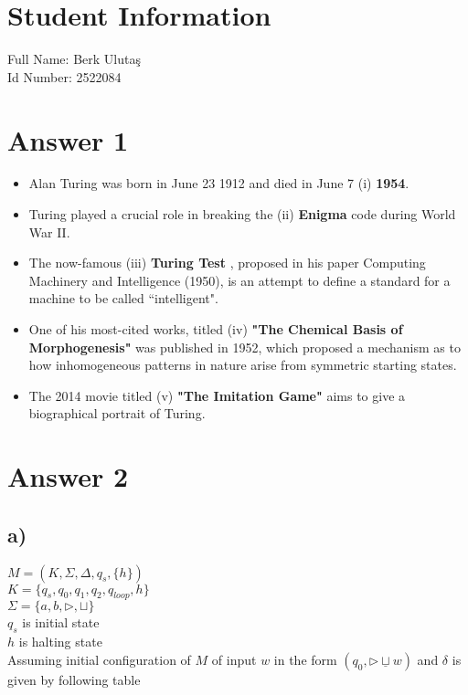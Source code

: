 \documentclass[12pt]{article}
\begin{document}
\section*{Student Information}
Full Name: Berk Ulutaş \\
Id Number: 2522084 \\

\section*{Answer 1}
\begin{itemize}
    \item Alan Turing was born in June 23 1912 and died in June 7 (i) \textbf{1954}.
    \item Turing played a crucial role in breaking the (ii) \textbf{Enigma} code during World War II.
    \item The now-famous (iii) \textbf{Turing Test} , proposed in his paper Computing Machinery and Intelligence (1950), is an attempt to define a standard for a machine to be called “intelligent".
    \item One of his most-cited works, titled (iv) \textbf{"The Chemical Basis of Morphogenesis"} was published in 1952, which proposed a mechanism as to how inhomogeneous patterns in nature arise from symmetric starting states.
    \item The 2014 movie titled (v) \textbf{"The Imitation Game"} aims to give a biographical portrait of Turing.
\end{itemize}

\section*{Answer 2}
\subsection*{a)}
$M = (K, \Sigma, \Delta, q_s, \{h\})$ \\ 
$K = \{q_s, q_0, q_1, q_2, q_{loop}, h\}$ \\
$\Sigma = \{a,b,\rhd, \sqcup\}$ \\ 
$q_s$ is initial state \\
$h$ is halting state \\ 

Assuming initial configuration of $M$ of input $w$ in the form $(q_0, \rhd \underline{\sqcup} w)$
and $\delta$ is given by following table \\
\end{document}
